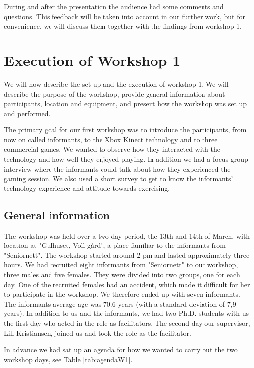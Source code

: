 During and after the presentation the audience had some comments and questions. This feedback will be taken into account in our further work, but for convenience, we will discuss them together with the findings from workshop 1. 

\section{Execution of Workshop 1}
\label{sec:ws1}
We will now describe the set up and the execution of workshop 1. We will describe the purpose of the workshop, provide general information about participants, location and equipment, and present how the workshop was set up and performed. 

The primary goal for our first workshop was to introduce the participants, from now on called informants, to the Xbox Kinect technology and to three commercial games. We wanted to observe how they interacted with the technology and how well they enjoyed playing. In addition we had a focus group interview where the informants could talk about how they experienced the gaming session. We also used a short survey to get to know the informants' technology experience and attitude towards exercising.   

\subsection{General information}
The workshop was held over a two day period, the 13th and 14th of March, with location at "Gulhuset, Voll gård", a place familiar to the informants from "Seniornett". The workshop started around 2 pm and lasted approximately three hours. We had recruited eight informants from "Seniornett" to our workshop, three males and five females. They were divided into two groups, one for each day. One of the recruited females had an accident, which made it difficult for her to participate in the workshop. We therefore ended up with seven informants. The informants average age was 70.6 years (with a standard deviation of 7,9 years). In addition to us and the informants, we had two Ph.D. students with us the first day who acted in the role as facilitators. The second day our supervisor, Lill Kristiansen, joined us and took the role as the facilitator.   

In advance we had sat up an agenda for how we wanted to carry out the two workshop days,  see Table \ref{tab:agendaW1}.  

